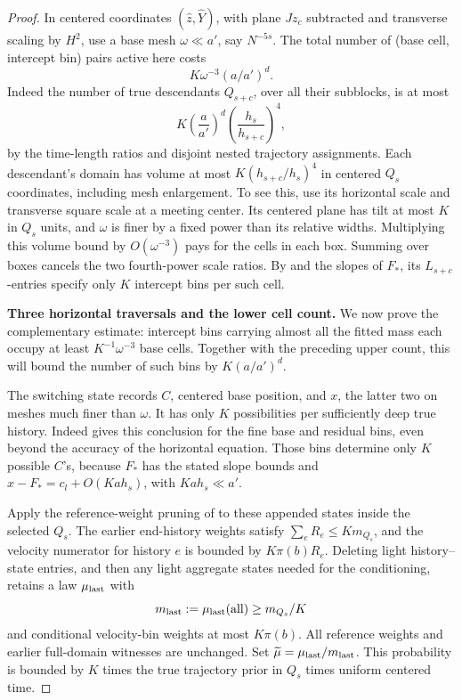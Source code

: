\begin{proof}
In centered coordinates \((\widehat z,\widehat Y)\), with plane \(J z_c\) subtracted and transverse scaling by \(H^2\), use a base mesh \(\omega\ll a'\), say \(N^{-5s}\). The total number of (base cell, intercept bin) pairs active here costs
\[
 K\omega^{-3}(a/a')^d .
\]
Indeed the number of true descendants \(Q_{s+c}\), over all their subblocks,
is at most
\[
 K\left(\frac{a}{a'}\right)^d
   \left(\frac{h_s}{h_{s+c}}\right)^4,
\]
by the time-length ratios and disjoint nested trajectory assignments.
Each descendant's domain has volume at most
\(K(h_{s+c}/h_s)^4\) in centered \(Q_s\) coordinates,
including mesh enlargement. To see this, use its horizontal scale
and transverse square scale at a meeting center. Its centered plane
has tilt at most \(K\) in \(Q_s\) units, and \(\omega\)
is finer by a fixed power than its relative widths.
Multiplying this volume bound by \(O(\omega^{-3})\) pays for the
cells in each box. Summing over boxes cancels the two fourth-power
scale ratios. By  and the slopes of \(F_*\), its \(L_{s+c}\)-entries specify only \(K\) intercept bins per such cell.

\par\smallskip\noindent\textbf{Three horizontal traversals and the lower cell count.}\quad
We now prove the complementary estimate: intercept bins carrying
almost all the fitted mass each occupy at least
\(K^{-1}\omega^{-3}\) base cells.  Together with the preceding
upper count, this will bound the number of such bins by
\(K(a/a')^d\).

The switching state records \(C\), centered base position, and
\(x\), the latter two on meshes much finer than \(\omega\).
It has only \(K\) possibilities per sufficiently deep true
history.  Indeed  gives this conclusion
for the fine base and residual bins, even beyond the accuracy of the
horizontal equation.  Those bins determine only \(K\) possible
\(C\)'s, because \(F_*\) has the stated slope bounds and
\(x-F_*=c_l+O(Ka h_s)\), with \(Ka h_s\ll a'\).

Apply the reference-weight pruning of 
to these appended states inside the selected \(Q_s\).  The
earlier end-history weights satisfy
\(\sum_eR_e\le Km_{Q_s}\), and the velocity numerator for
history \(e\) is bounded by \(K\pi(b)R_e\).  Deleting
light history--state entries, and then any light aggregate states
needed for the conditioning, retains a law \(\mu_{\rm last}\)
with
\[
 m_{\rm last}:=\mu_{\rm last}(\mathrm{all})\ge m_{Q_s}/K
\]
and conditional velocity-bin weights at most \(K\pi(b)\).
All reference weights and earlier full-domain witnesses are unchanged.
Set \(\widetilde\mu=\mu_{\rm last}/m_{\rm last}\).
This probability is bounded by \(K\) times the true trajectory
prior in \(Q_s\) times uniform centered time.


\end{proof}
